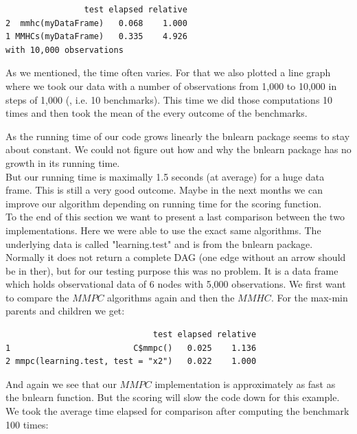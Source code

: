  	\begin{verbatim}
                test elapsed relative
2  mmhc(myDataFrame)   0.068    1.000
1 MMHCs(myDataFrame)   0.335    4.926
with 10,000 observations
 	\end{verbatim}

 	As we mentioned, the time often varies. For that we also plotted a line graph where we took our data with a number of observations from 1,000 to 10,000 in steps of 1,000 (, i.e. 10 benchmarks). This time we did those computations 10 times and then took the mean of the every outcome of the benchmarks.


	As the running time of our code grows linearly the bnlearn package seems to stay about constant. We could not figure out how and why the bnlearn package has no growth in its running time.\\
	But our running time is maximally 1.5 seconds (at average) for a huge data frame. This is still a very good outcome. Maybe in the next months we can improve our algorithm depending on running time for the scoring function.\\

	To the end of this section we want to present a last comparison between the two implementations. Here we were able to use the exact same algorithms. The underlying data is called "learning.test" and is from the bnlearn package. Normally it does not return a complete DAG (one edge without an arrow should be in ther), but for our testing purpose this was no problem. It is a data frame which holds observational data of 6 nodes with 5,000 observations. We first want to compare the $MMPC$ algorithms again and then the $MMHC$. For the max-min parents and children we get:

 	\begin{verbatim}
                              test elapsed relative
1                         C$mmpc()   0.025    1.136
2 mmpc(learning.test, test = "x2")   0.022    1.000
 	\end{verbatim}

 	And again we see that our $MMPC$ implementation is approximately as fast as the bnlearn function. But the scoring will slow the code down for this example. We took the average time elapsed for comparison after computing the benchmark 100 times:

